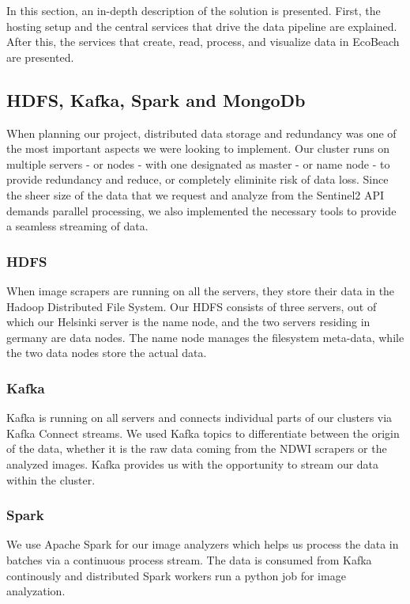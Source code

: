 In this section, an in-depth description of the solution is presented. First, the hosting setup and the central services that drive the data pipeline are explained. After this, the services that create, read, process, and visualize data in EcoBeach are presented.

\subsection{HDFS, Kafka, Spark and MongoDb} \label{subsec:the-stack}
When planning our project, distributed data storage and redundancy was one of the most important aspects we were looking to implement.
Our cluster runs on multiple servers - or nodes - with one designated as master - or name node - to provide redundancy and reduce, or completely eliminite risk of data loss.
Since the sheer size of the data that we request and analyze from the Sentinel2 API demands parallel processing, we also implemented the necessary tools to provide a seamless streaming of data.


\subsubsection{HDFS}
When image scrapers are running on all the servers, they store their data in the Hadoop Distributed File System. Our HDFS consists of three servers, out of which our Helsinki server is the name node, and the two servers residing in germany are data nodes.
The name node manages the filesystem meta-data, while the two data nodes store the actual data.

\subsubsection{Kafka}
Kafka is running on all servers and connects individual parts of our clusters via Kafka Connect streams. We used Kafka topics to differentiate between the origin of the data, whether it is the raw data coming from the NDWI scrapers or the analyzed images.
Kafka provides us with the opportunity to stream our data within the cluster.

\subsubsection{Spark}
We use Apache Spark for our image analyzers which helps us process the data in batches via a continuous process stream. The data is consumed from Kafka continously and distributed Spark workers run a python job for image analyzation.
